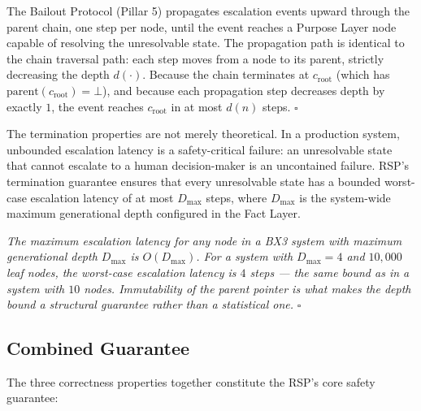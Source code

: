 \begin{Proof}
The Bailout Protocol (Pillar 5) propagates escalation events upward through the parent chain, one step per node, until the event reaches a Purpose Layer node capable of resolving the unresolvable state. The propagation path is identical to the chain traversal path: each step moves from a node to its parent, strictly decreasing the depth $d(\cdot)$. Because the chain terminates at $c_{\text{root}}$ (which has $\text{parent}(c_{\text{root}}) = \bot$), and because each propagation step decreases depth by exactly $1$, the event reaches $c_{\text{root}}$ in at most $d(n)$ steps. $\square$
\end{Proof}

The termination properties are not merely theoretical. In a production system, unbounded escalation latency is a safety-critical failure: an unresolvable state that cannot escalate to a human decision-maker is an uncontained failure. RSP's termination guarantee ensures that every unresolvable state has a bounded worst-case escalation latency of at most $D_{\max}$ steps, where $D_{\max}$ is the system-wide maximum generational depth configured in the Fact Layer.

\begin{corol}
\textit{The maximum escalation latency for any node in a BX3 system with maximum generational depth $D_{\max}$ is $O(D_{\max})$. For a system with $D_{\max} = 4$ and $10{,}000$ leaf nodes, the worst-case escalation latency is $4$ steps — the same bound as in a system with $10$ nodes. Immutability of the parent pointer is what makes the depth bound a structural guarantee rather than a statistical one.} $\square$
\end{corol}


\subsection{Combined Guarantee}
\label{sec:combined-guarantee}

The three correctness properties together constitute the RSP's core safety guarantee:


